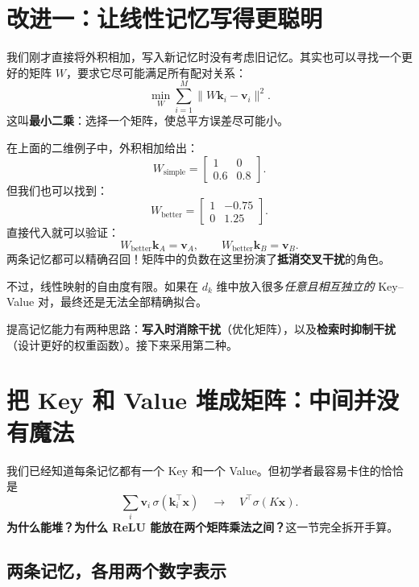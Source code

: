 \documentclass[11pt,a4paper,UTF8]{ctexart}
\numberwithin{equation}{section}
\newcommand{\vect}[1]{\boldsymbol{#1}}
\begin{document}
\section{改进一：让线性记忆写得更聪明}

我们刚才直接将外积相加，写入新记忆时没有考虑旧记忆。其实也可以寻找一个更好的矩阵 $W$，要求它尽可能满足所有配对关系：
\begin{equation}
\boxed{\min_W\sum_{i=1}^{M}\|W\vect{k}_i-\vect{v}_i\|^2.}
\end{equation}
这叫\textbf{最小二乘}：选择一个矩阵，使总平方误差尽可能小。

在上面的二维例子中，外积相加给出：
\[
W_{\text{simple}}=\begin{bmatrix}1&0\\0.6&0.8\end{bmatrix}.
\]
但我们也可以找到：
\begin{equation}
W_{\text{better}}=\begin{bmatrix}1&-0.75\\0&1.25\end{bmatrix}.
\end{equation}
直接代入就可以验证：
\[
W_{\text{better}}\vect{k}_A=\vect{v}_A,\qquad
W_{\text{better}}\vect{k}_B=\vect{v}_B.
\]
两条记忆都可以精确召回！矩阵中的负数在这里扮演了\textbf{抵消交叉干扰}的角色。

不过，线性映射的自由度有限。如果在 $d_k$ 维中放入很多\emph{任意且相互独立的} Key--Value 对，最终还是无法全部精确拟合。

\begin{idea}
提高记忆能力有两种思路：\textbf{写入时消除干扰}（优化矩阵），以及\textbf{检索时抑制干扰}（设计更好的权重函数）。接下来采用第二种。
\end{idea}


\section{把 Key 和 Value 堆成矩阵：中间并没有魔法}

我们已经知道每条记忆都有一个 Key 和一个 Value。但初学者最容易卡住的恰恰是
\[
\sum_i\vect{v}_i\,\sigma(\vect{k}_i^\top\vect{x})
\quad\longrightarrow\quad
V^\top\sigma(K\vect{x}).
\]
\textbf{为什么能堆？为什么 ReLU 能放在两个矩阵乘法之间？}这一节完全拆开手算。

\subsection{两条记忆，各用两个数字表示}
\end{document}

